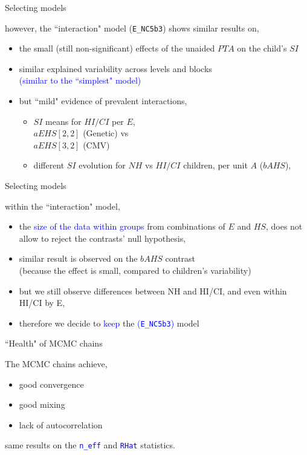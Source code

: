 \begin{lhframe}[rhgraphic={\texttt{[image: select\_model2.png]}}]
	{Selecting models}
	
	however, the ``interaction" model (\texttt{E\_NC5b3}) shows similar results on,
	\begin{itemize}
		\item the small (still non-significant) effects of the unaided $PTA$ on the child's $SI$ 
		\item similar explained variability across levels and blocks \\
		{\small \textcolor{blue}{(similar to the ``simplest" model)}}
		\item but ``mild" evidence of prevalent interactions,
		\begin{itemize}
			\item $SI$ means for $HI/CI$ per $E$, \\
			$aEHS[2,2]$ (Genetic) vs \\
			$aEHS[3,2]$ (CMV)
			\item different $SI$ evolution for $NH$ vs $HI/CI$ children, per unit $A$ ($bAHS$), 
		\end{itemize}
	\end{itemize}
\end{lhframe}
%
%
\begin{lhframe}[rhgraphic={\texttt{[image: contrasts.png]}}]
	{Selecting models}
	
	within the ``interaction" model,
	\begin{itemize}
		\item the \textcolor{blue}{size of the data within groups} from combinations of $E$ and $HS$, does not allow to reject the contrasts' null hypothesis,
		\item similar result is observed on the $bAHS$ contrast \\
		{\small (because the effect is small, compared to children's variability)}
		\item but we still observe differences between NH and HI/CI, and even within HI/CI by E,
		\item therefore we decide to \textcolor{blue}{keep} the \textcolor{blue}{(\texttt{E\_NC5b3})} model 
	\end{itemize}
\end{lhframe}
%
%
\begin{lhframe}[rhgraphic={\texttt{[image: chains\_real1.pdf]}}]
	{``Health" of MCMC chains}
	
	The MCMC chains achieve,
	\begin{itemize}
		\item good convergence
		\item good mixing
		\item lack of autocorrelation
	\end{itemize}
	
	same results on the \textcolor{blue}{ \texttt{n\_eff} } and \textcolor{blue}{ \texttt{RHat} } statistics.
\end{lhframe}

